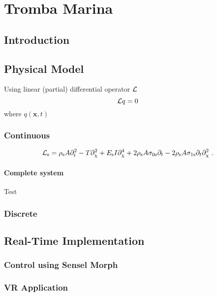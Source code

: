 \chapter{Tromba Marina}\label{ch:tromba}
\section{Introduction}

\section{Physical Model}
Using linear (partial) differential operator $\mathcal{L}$ 
\begin{equation}
    \mathcal{L} q = 0
\end{equation}
where $q(\boldsymbol{x}, t)$
\subsection{Continuous}
\begin{equation}
    \L_\stxt = \rho_\stxt A \ptt - T\partial_\chi^2 + E_\text{s}I\partial_\chi^4+2\rho_\stxt A\szX[\stxt]\pt-2\rho_\stxt A\soX[\stxt]\pt\partial_\chi^2\ .
\end{equation}

\subsubsection{Complete system}
Test
\subsection{Discrete}

\section{Real-Time Implementation}

\subsection{Control using Sensel Morph}

\subsection{VR Application}
